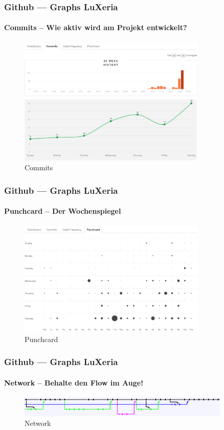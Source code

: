 \begin{frame}
    \frametitle{Github --- Graphs \hfill{} LuXeria}
    \framesubtitle{Commits -- Wie aktiv wird am Projekt entwickelt? }
    \begin{figure}
        \includegraphics[width=0.8\textwidth]{github_commits.pdf}
        \caption{Commits}
    \end{figure}
\end{frame}

\begin{frame}
    \frametitle{Github --- Graphs \hfill{} LuXeria}
    \framesubtitle{Punchcard -- Der Wochenspiegel}
        \begin{figure}
            \includegraphics[width=0.8\textwidth]{github_punchcard.pdf}
            \caption{Punchcard}
        \end{figure}
\end{frame}

\begin{frame}
    \frametitle{Github --- Graphs \hfill{} LuXeria}
    \framesubtitle{Network -- Behalte den Flow im Auge!}
        \begin{figure}
            \includegraphics[width=0.9\textwidth]{github_network.pdf}
            \caption{Network}
        \end{figure}
\end{frame}

